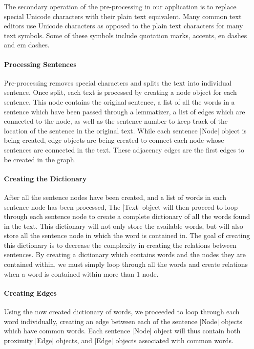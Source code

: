 		The secondary operation of the pre-processing in our application is to replace special Unicode characters with their plain text equivalent. Many common text editors use Unicode characters as opposed to the plain text characters for many text symbols. Some of these symbols include quotation marks, accents, en dashes and em dashes.
		
	\paragraph{Processing Sentences}
		
		Pre-processing removes special characters and splits the text into individual sentence. Once split, each text is processed by creating a node object for each sentence. This node contains the original sentence, a list of all the words in a sentence which have been passed through a lemmatizer, a list of edges which are connected to the node, as well as the sentence number to keep track of the location of the sentence in the original text. While each sentence |Node| object is being created, edge objects are being created to connect each node whose sentences are connected in the text. These adjacency edges are the first edges to be created in the graph.
	
	\paragraph{Creating the Dictionary}
	
		After all the sentence nodes have been created, and a list of words in each sentence node has been processed, The |Text| object will then proceed to loop through each sentence node to create a complete dictionary of all the words found in the text. This dictionary will not only store the available words, but will also store all the sentence node in which the word is contained in. The goal of creating this dictionary is to decrease the complexity in creating the relations between sentences. By creating a dictionary which contains words and the nodes they are contained within, we must simply loop through all the words and create relations when a word is contained within more than 1 node.
		
	\paragraph{Creating Edges}
	
		Using the now created dictionary of words, we proceeded to loop through each word individually, creating an edge between each of the sentence |Node| objects which have common words. Each sentence |Node| object will thus contain both proximity |Edge| objects, and |Edge| objects associated with common words.
		
